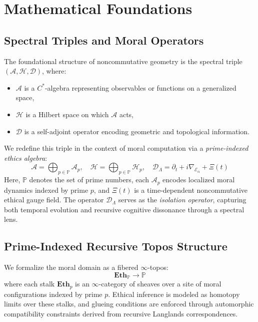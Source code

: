 \documentclass{article}
\theoremstyle{plain}
\theoremstyle{claimstyle}
\begin{document}
\section{Mathematical Foundations}

\subsection{Spectral Triples and Moral Operators}

The foundational structure of noncommutative geometry is the spectral triple $(\mathcal{A}, \mathcal{H}, \mathcal{D})$, where:
\begin{itemize}
    \item $\mathcal{A}$ is a $C^*$-algebra representing observables or functions on a generalized space,
    \item $\mathcal{H}$ is a Hilbert space on which $\mathcal{A}$ acts,
    \item $\mathcal{D}$ is a self-adjoint operator encoding geometric and topological information.
\end{itemize}

We redefine this triple in the context of moral computation via a \textit{prime-indexed ethics algebra}:
\[
\mathcal{A} = \bigoplus_{p \in \mathbb{P}} \mathcal{A}_p, \quad \mathcal{H} = \bigoplus_{p \in \mathbb{P}} \mathcal{H}_p, \quad \mathcal{D}_\Lambda = \partial_t + i \nabla_{\mathcal{E}_\alpha} + \Xi(t)
\]
Here, $\mathbb{P}$ denotes the set of prime numbers, each $\mathcal{A}_p$ encodes localized moral dynamics indexed by prime $p$, and $\Xi(t)$ is a time-dependent noncommutative ethical gauge field. The operator $\mathcal{D}_\Lambda$ serves as the \textit{isolation operator}, capturing both temporal evolution and recursive cognitive dissonance through a spectral lens.

\subsection{Prime-Indexed Recursive Topos Structure}

We formalize the moral domain as a fibered $\infty$-topos:
\[
\mathbf{Eth}_{\mathbb{P}} \longrightarrow \mathbb{P}
\]
where each stalk $\mathbf{Eth}_p$ is an $\infty$-category of sheaves over a site of moral configurations indexed by prime $p$. Ethical inference is modeled as homotopy limits over these stalks, and glueing conditions are enforced through automorphic compatibility constraints derived from recursive Langlands correspondences.
\end{document}
